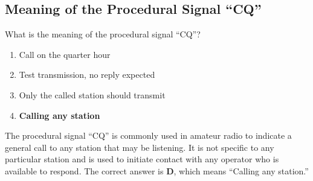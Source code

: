 \subsection{Meaning of the Procedural Signal “CQ”}
\label{T2A08}

\begin{tcolorbox}[colback=gray!10!white,colframe=black!75!black,title=T2A08]
What is the meaning of the procedural signal “CQ”?  
\begin{enumerate}[noitemsep]
    \item Call on the quarter hour
    \item Test transmission, no reply expected
    \item Only the called station should transmit
    \item \textbf{Calling any station}
\end{enumerate}
\end{tcolorbox}

The procedural signal “CQ” is commonly used in amateur radio to indicate a general call to any station that may be listening. It is not specific to any particular station and is used to initiate contact with any operator who is available to respond. The correct answer is \textbf{D}, which means “Calling any station.”